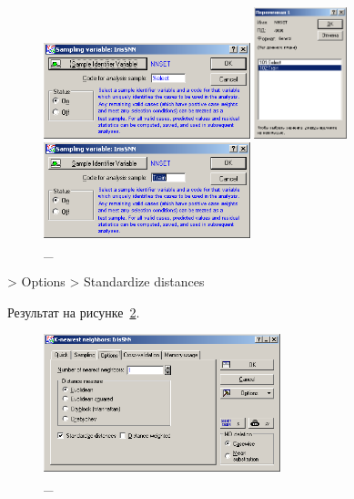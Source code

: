 \begin{figure}[!h]
  \centering

  \begin{minipage}{0.32\textwidth}
    \centering

    \includegraphics[width=6cm]
    {inc/ex_8.PNG}

    \caption{\_}

    \label{fig:8}
  \end{minipage}
  \begin{minipage}{0.32\textwidth}
    \centering

    \includegraphics[height=3.8cm]
    {inc/ex_9.PNG}

    \caption{\_}

    \label{fig:9}
  \end{minipage}
  \begin{minipage}{0.32\textwidth}
    \centering

    \includegraphics[width=6cm]
    {inc/ex_10.PNG}

    \caption{\_}

    \label{fig:10}
  \end{minipage}
\end{figure}

\newpage

> Options > Standardize distances

Результат на рисунке~\ref{fig:11_1}.

\begin{figure}[!h]
  \centering

  \includegraphics[height=4cm]
  {inc/ex_11.PNG}

  \caption{\_}

  \label{fig:11_1}
\end{figure}

